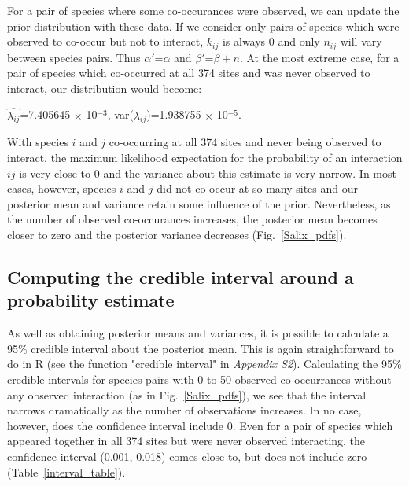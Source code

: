 \documentclass[12pt]{article}
\begin{document}
      For a pair of species where some co-occurances were observed, we can update the prior distribution with these data. If we consider only pairs of species which were observed to co-occur but not to interact, $k_{ij}$ is always 0 and only $n_{ij}$ will vary between species pairs. Thus $\alpha'$=$\alpha$ and $\beta'$=$\beta + n$. At the most extreme case, for a pair of species which co-occurred at all 374 sites and was never observed to interact, our distribution would become:


      $\hat{\lambda_{ij}}$=7.405645 $\times$ 10$^{-3}$, var($\lambda_{ij}$)=1.938755 $\times$ 10$^{-5}$.
      
      With species $i$ and $j$ co-occurring at all 374 sites and never being observed to interact, the maximum likelihood expectation for the probability of an interaction $ij$ is very close to 0 and the variance about this estimate is very narrow. In most cases, however, species $i$ and $j$ did not co-occur at so many sites and our posterior mean and variance retain some influence of the prior. Nevertheless, as the number of observed co-occurances increases, the posterior mean becomes closer to zero and the posterior variance decreases (Fig.~\ref{Salix_pdfs}).


  \subsection*{Computing the credible interval around a probability estimate}

      As well as obtaining posterior means and variances, it is possible to calculate a 95\% credible interval about the posterior mean. This is again straightforward to do in R (see the function "credible interval" in \emph{Appendix S2}). Calculating the 95\% credible intervals for species pairs with 0 to 50 observed co-occurrances without any observed interaction (as in Fig.~\ref{Salix_pdfs}), we see that the interval narrows dramatically as the number of observations increases. In no case, however, does the confidence interval include 0. Even for a pair of species which appeared together in all 374 sites but were never observed interacting, the confidence interval (0.001, 0.018) comes close to, but does not include zero (Table~\ref{interval_table}). 
\end{document}
